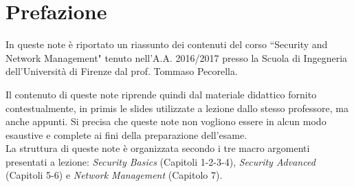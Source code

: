 \chapter*{Prefazione}
In queste note è riportato un riassunto dei contenuti del corso \textquotedblleft Security and Network Management" tenuto nell'A.A. 2016/2017 presso la Scuola di Ingegneria dell'Università di Firenze dal prof. Tommaso Pecorella.

Il contenuto di queste note riprende quindi dal materiale didattico fornito contestualmente, in primis le slides utilizzate a lezione dallo stesso professore, ma anche appunti. Si precisa che queste note non vogliono essere in alcun modo esaustive e complete ai fini della preparazione dell'esame.\\
La struttura di queste note è organizzata secondo i tre macro argomenti presentati a lezione: \textit{Security Basics} (Capitoli 1-2-3-4), \textit{Security Advanced} (Capitoli 5-6) e \textit{Network Management} (Capitolo 7).
